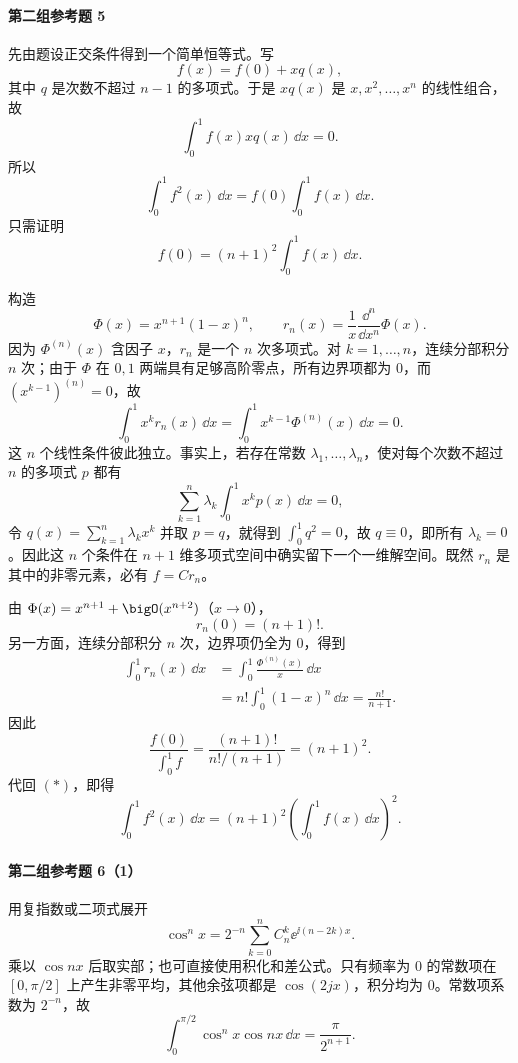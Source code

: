 \paragraph{第二组参考题 5}
\begin{xsolution}
先由题设正交条件得到一个简单恒等式。写
\[
  f(x)=f(0)+xq(x),
\]
其中 $q$ 是次数不超过 $n-1$ 的多项式。于是 $xq(x)$ 是 $x,x^2,\ldots,x^n$ 的线性组合，故
\[
  \int_0^1 f(x)xq(x)\,\dd x=0.
\]
所以
\begin{equation}
  \int_0^1f^2(x)\,\dd x
  =f(0)\int_0^1f(x)\,\dd x.
  \tag{*}
\end{equation}
只需证明
\[
  f(0)=(n+1)^2\int_0^1f(x)\,\dd x.
\]

构造
\[
  \Phi(x)=x^{n+1}(1-x)^n,
  \qquad
  r_n(x)=\frac1x\frac{\dd^n}{\dd x^n}\Phi(x).
\]
因为 $\Phi^{(n)}(x)$ 含因子 $x$，$r_n$ 是一个 $n$ 次多项式。对 $k=1,\ldots,n$，连续分部积分 $n$ 次；由于 $\Phi$ 在 $0,1$ 两端具有足够高阶零点，所有边界项都为 $0$，而 $(x^{k-1})^{(n)}=0$，故
\[
  \int_0^1x^kr_n(x)\,\dd x
  =\int_0^1x^{k-1}\Phi^{(n)}(x)\,\dd x=0.
\]
这 $n$ 个线性条件彼此独立。事实上，若存在常数 $\lambda_1,\ldots,\lambda_n$，使对每个次数不超过 $n$ 的多项式 $p$ 都有
\[
  \sum_{k=1}^n\lambda_k\int_0^1x^kp(x)\,\dd x=0,
\]
令 $q(x)=\sum_{k=1}^n\lambda_kx^k$ 并取 $p=q$，就得到 $\int_0^1q^2=0$，故 $q\equiv0$，即所有 $\lambda_k=0$。因此这 $n$ 个条件在 $n+1$ 维多项式空间中确实留下一个一维解空间。既然 $r_n$ 是其中的非零元素，必有 $f=C r_n$。

由 $\Phi(x)=x^{n+1}+\bigO(x^{n+2})$（$x\to0$），
\[
  r_n(0)=(n+1)!.
\]
另一方面，连续分部积分 $n$ 次，边界项仍全为 $0$，得到
\begin{align*}
  \int_0^1r_n(x)\,\dd x
  &=\int_0^1\frac{\Phi^{(n)}(x)}x\,\dd x\\
  &=n!\int_0^1(1-x)^n\,\dd x
  =\frac{n!}{n+1}.
\end{align*}
因此
\[
  \frac{f(0)}{\int_0^1f}
  =\frac{(n+1)!}{n!/(n+1)}=(n+1)^2.
\]
代回 $(*)$，即得
\[
  \boxed{\int_0^1f^2(x)\,\dd x
  =(n+1)^2\left(\int_0^1f(x)\,\dd x\right)^2}.
\]
\end{xsolution}

\paragraph{第二组参考题 6（1）}
\begin{xsolution}
用复指数或二项式展开
\[
  \cos^n x=2^{-n}\sum_{k=0}^n C_n^k\ee^{\ii(n-2k)x}.
\]
乘以 $\cos nx$ 后取实部；也可直接使用积化和差公式。只有频率为 $0$ 的常数项在 $[0,\pi/2]$ 上产生非零平均，其他余弦项都是 $\cos(2jx)$，积分均为 $0$。常数项系数为 $2^{-n}$，故
\[
  \boxed{\int_0^{\pi/2}\cos^n x\cos nx\,\dd x
  =\frac{\pi}{2^{n+1}}}.
\]
\end{xsolution}

